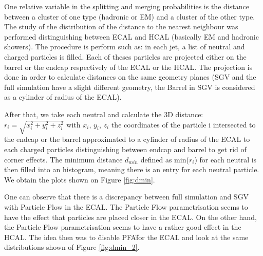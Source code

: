 One relative variable in the splitting and merging probabilities is the distance between a cluster of one type (hadronic or EM) and a cluster of the other type. The study of the distribution of the distance to the nearest neighbour was performed distinguishing between ECAL and HCAL (basically EM and hadronic showers). The procedure is perform such as: in each jet, a list of neutral and charged particles is filled. Each of theses particles are projected either on the barrel or the endcap respectively of the ECAL or the HCAL. The projection is done in order to calculate distances on the same geometry planes (SGV and the full simulation have a slight different geometry, the Barrel in SGV is considered as a cylinder of radius of the ECAL).

After that, we take each neutral and calculate the 3D distance: $r_i = \sqrt{x_i^2 + y_i^2 + z_i^2}$ with $x_i$, $y_i$, $z_i$ the coordinates of the particle i intersected to the endcap or the barrel approximated to a cylinder of radius of the ECAL to each charged particles distinguishing between endcap and barrel to get rid of corner effects. The minimum distance $d_{min}$ defined as min($r_i$) for each neutral is then filled into an histogram, meaning there is an entry for each neutral particle. We obtain the plots shown on Figure \ref{fig:dmin}.


One can observe that there is a discrepancy between full simulation and SGV with Particle Flow in the ECAL. The Particle Flow parametrisation seems to have the effect that particles are placed closer in the ECAL. On the other hand, the Particle Flow parametrisation seems to have a rather good effect in the HCAL. The idea then was to \"disable PFA\" for the ECAL and look at the same distributions shown of Figure \ref{fig:dmin_2}.

